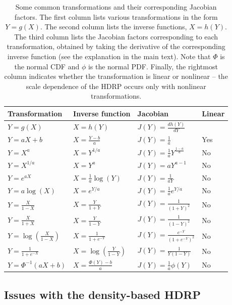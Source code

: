 \documentclass[9pt,twocolumn,twoside]{cidlab-draft}\templatetype{cidlab-invited}
\newcommand{\hdr}{HDRP}
\begin{document}
\begin{table}[bt]
\centering 
\caption{Some common transformations and their corresponding Jacobian factors. The first column lists various transformations in the form $Y=g(X)$. The second column lists the inverse functions, $X=h(Y)$. The third column lists the Jacobian factors corresponding to each transformation, obtained by taking the derivative of the corresponding inverse function (see the explanation in the main text). Note that $\Phi$ is the normal CDF and $\phi$ is the normal PDF. Finally, the rightmost column indicates whether the transformation is linear or nonlinear -- the scale dependence of the \hdr{} occurs only with nonlinear transformations.}
\label{tab:transformations}
\begin{tabular}{llll}\hline
Transformation & Inverse function & Jacobian & Linear  \\ \hline
$Y = g(X)$ & $X = h(Y)$ & $J(Y) =\frac{dh(Y)}{dY}$ &  \\\hline
$Y=aX +b$  & $X= \frac{Y-b}{a}$ & $J(Y)=\frac{1}{a}$ & Yes \\
$Y= X^a$   & $X = Y^{1/a}$      & $J(Y)=\frac{1}{a} Y^{\frac{1-a}{a}}$ & No \\
$Y= X^{1/a}$ & $X = Y^{a}$ & $J(Y)=a Y^{a-1}$ & No \\
$Y = e^{aX}$ & $X = \frac{1}{a}\log(Y)$ & $J(Y)=\frac{1}{aY}$& No \\
$Y = a\log(X)$  & $X = e^{Y/a}$ & $J(Y)=\frac{1}{a}e^{Y/a}$& No \\
$Y = \frac{X}{1-X}$ & $X = \frac{Y}{1+Y}$  & $J(Y)=\frac{1}{(1+Y)^2}$ & No\\
$Y = \frac{X}{1+X}$ & $X = \frac{Y}{1-Y}$ & $J(Y)=\frac{1}{(1-Y)^2}$& No\\
$Y = \log\left(\frac{X}{1-X}\right)$ & $X = \frac{1}{1+e^{-Y}}$ & $J(Y)=\frac{e^{-Y}}{\left(1+e^{-Y}\right)^2}$& No \\
$Y = \frac{1}{1+e^{-X}}$ & $X = \log\left(\frac{Y}{1-Y}\right)$ & $J(Y)=\frac{1}{Y(1-Y)}$& No\\
$Y = \Phi^{-1}(aX+b)$ & $X = \frac{\Phi(Y)-b}{a}$  & $J(Y)=\frac{1}{a}\phi(Y)$& No\\[.5ex]\hline
\end{tabular}
\end{table}

\subsection*{Issues with the density-based \hdr{}}
\end{document}
